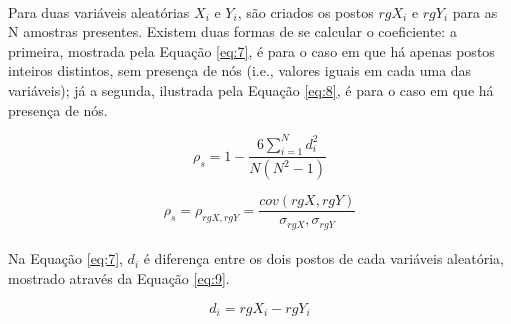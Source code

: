 \paragraph{} Para duas variáveis aleatórias \begin{math}X_i\end{math} e \begin{math}Y_i\end{math}, são criados os postos \begin{math}rgX_i\end{math} e \begin{math}rgY_i\end{math} para as N amostras presentes. Existem duas formas de se calcular o coeficiente: a primeira, mostrada pela Equação \ref{eq:7}, é para o caso em que há apenas postos inteiros distintos, sem presença de nós (i.e., valores iguais em cada uma das variáveis); já a segunda, ilustrada pela Equação \ref{eq:8}, é para o caso em que há presença de nós.

\begin{equation} \label{eq:7}
    \rho_s = 1 - \frac{6\sum_{i=1}^{N}d_i^2}{N(N^2-1)}
\end{equation}

\begin{equation} \label{eq:8}
    \rho_s = \rho_{rgX, rgY} = \frac{cov(rgX, rgY)}{\sigma_{rgX}, \sigma_{rgY}}
\end{equation}

\paragraph{} Na Equação \ref{eq:7}, \begin{math}d_i\end{math} é diferença entre os dois postos de cada variáveis aleatória, mostrado através da Equação \ref{eq:9}.

\begin{equation} \label{eq:9}
    d_i = rgX_i - rgY_i
\end{equation}

